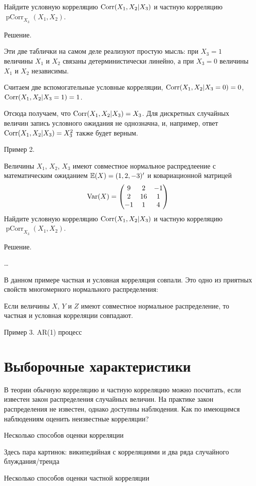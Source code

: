 \documentclass[10pt]{article}
\DeclareMathOperator{\pCorr}{pCorr}
\begin{document}
Найдите условную корреляцию $\operatorname{Corr}(X_1,X_2|X_3)$ и частную корреляцию $\pCorr_{X_3}(X_1,X_2)$.

Решение.

Эти две таблички на самом деле реализуют простую мысль: при $X_3=1$ величины $X_1$ и $X_2$  связаны детерминистически линейно, а при $X_3=0$ величины $X_1$ и $X_2$ независимы.

Считаем две вспомогательные условные корреляции, $\operatorname{Corr}(X_1,X_2|X_3=0)=0$, $\operatorname{Corr}(X_1,X_2|X_3=1)=1$.

Отсюда получаем, что $\operatorname{Corr}(X_1,X_2|X_3)=X_3$. Для дискретных случайных величин запись условного ожидания не однозначна, и, например, ответ $\operatorname{Corr}(X_1,X_2|X_3)=X_3^2$ также будет верным.



Пример 2.

Величины $X_1$, $X_2$, $X_3$ имеют совместное нормальное распредлеение с математическим ожиданием $\mathbb{E}(X)=(1,2,-3)'$ и ковариационной матрицей 
\[
\operatorname{Var}(X)=\begin{pmatrix}
9 & 2 & -1 \\
2 & 16 & 1 \\
-1 & 1 & 4 
\end{pmatrix}
\]
Найдите условную корреляцию $\operatorname{Corr}(X_1,X_2|X_3)$ и частную корреляцию $\pCorr_{X_3}(X_1,X_2)$.

Решение.

\ldots

В данном примере частная и условная корреляция совпали. Это одно из приятных свойств многомерного нормального распределения: 


\begin{theorem}
Если величины $X$, $Y$ и $Z$ имеют совместное нормальное распределение, то частная и условная корреляции совпадают.
\end{theorem}

Пример 3. AR(1) процесс


\section{Выборочные характеристики}

В теории обычную корреляцию и частную корреляцию можно посчитать, если известен закон распределения случайных величин. На практике закон распределения не известен, однако доступны наблюдения. Как по имеющимся наблюдениям оценить неизвестные корреляции?


Несколько способов оценки корреляции


Здесь пара картинок: википедийная с корреляциями и два ряда случайного блуждания/тренда



Несколько способов оценки частной корреляции
\end{document}
